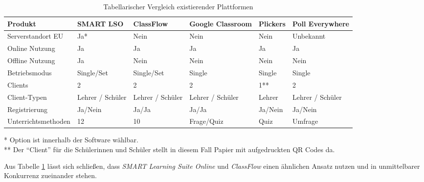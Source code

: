 \begin{table}[h!]
	\caption{Tabellarischer Vergleich existierender Plattformen}
	\label{tab:vergplatt}
	{\small
	\begin{tabularx}{\textwidth}{lXXXXX}
		\toprule
		\rule[-1ex]{0pt}{2.5ex} \textbf{Produkt} & \textbf{SMART LSO} & \textbf{ClassFlow} & \textbf{Google Classroom} & \textbf{Plickers} & \textbf{Poll Every\-where} \\ 
		\midrule 
		\rowcolor[HTML]{EFEFEF} 
		\rule[-1ex]{0pt}{2.5ex} Serverstandort EU &  Ja* & Nein & Nein & Nein & Unbekannt \\ 
	
		\rule[-1ex]{0pt}{2.5ex} Online Nutzung & Ja & Ja & Ja & Ja & Ja \\ 
		\rowcolor[HTML]{EFEFEF} 
		\rule[-1ex]{0pt}{2.5ex} Offline Nutzung & Ja & Nein & Nein & Nein & Nein \\ 
		
		\rule[-1ex]{0pt}{2.5ex} Betriebsmodus & Single/Set & Single/Set & Single & Single & Single \\ 
		
		\rowcolor[HTML]{EFEFEF} 
		\rule[-1ex]{0pt}{2.5ex} Clients & 2  & 2  & 2  & 1** & 2 \\ 
		
		\rule[-1ex]{0pt}{2.5ex} Client-Typen & Lehrer / Schüler & Lehrer / Schüler & Lehrer / Schüler & Lehrer & Lehrer / Schüler \\ 
		
		\rowcolor[HTML]{EFEFEF} 
		\rule[-1ex]{0pt}{2.5ex} Registrierung & Ja/Nein & Ja/Ja & Ja/Ja & Ja/Nein & Ja/Nein \\ 
		
		\rule[-1ex]{0pt}{2.5ex} Unterrichtsmethoden & 12 & 10 & Frage/Quiz & Quiz & Umfrage \\ 
		
	\end{tabularx} 
	}
\vspace{0.1cm}
\footnotesize {
	* Option ist innerhalb der Software wählbar. \\
	** Der "`Client"' für die Schülerinnen und Schüler stellt in diesem Fall Papier mit aufgedruckten QR Codes da.
}

\end{table}

Aus Tabelle \ref{tab:vergplatt} lässt sich schließen, dass \emph{SMART Learning Suite Online} und \emph{ClassFlow} einen ähnlichen Ansatz nutzen und in unmittelbarer Konkurrenz 
zueinander stehen. 

